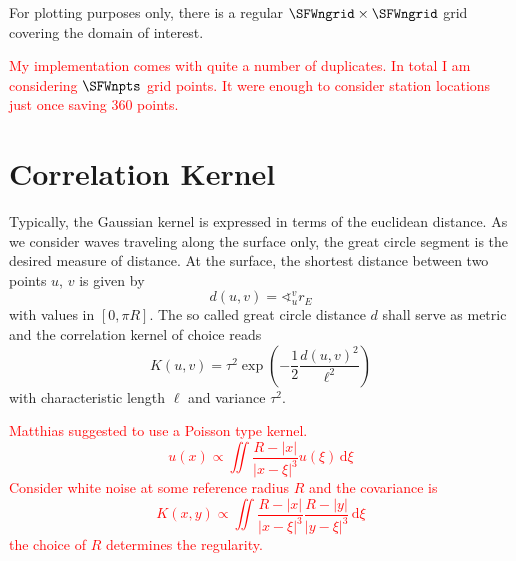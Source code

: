 \documentclass[11pt]{article}
\newcommand\worries[1]{\textcolor{red}{#1}}
\begin{document}
For plotting purposes only, there is a regular $\SFWngrid \times \SFWngrid$ grid covering the domain of interest.

\worries{My implementation comes with quite a number of duplicates.
In total I am considering $\SFWnpts$ grid points.
It were enough to consider station locations just once saving 360 points.}


\section{Correlation Kernel}

Typically, the Gaussian kernel is expressed in terms of the euclidean distance.
As we consider waves traveling along the surface only, the great circle segment is the desired measure of distance.
At the surface, the shortest distance between two points $u$, $v$ is given by
\begin{equation}
    d(u,v) = \sphericalangle_u^v r_E
\end{equation}
with values in $[0, \pi R]$.
The so called great circle distance $d$ shall serve as metric and the correlation kernel of choice reads
\begin{equation}
    K(u,v) = \tau^2 \exp\!\left(-\frac 12 \frac{d(u,v)^2}{\ell^2}\right)
\end{equation}
with characteristic length $\ell$ and variance $\tau^2$.

\worries{Matthias suggested to use a Poisson type kernel.
\begin{equation}
    u(x) \propto \iint \frac{R-|x|}{|x-\xi|^3} u(\xi) \, \mathrm d \xi
\end{equation}
Consider white noise at some reference radius $R$ and the covariance is
\begin{equation}
    K(x,y) \propto \iint \frac{R-|x|}{|x-\xi|^3} \frac{R-|y|}{|y-\xi|^3} \, \mathrm d \xi
\end{equation}
the choice of $R$ determines the regularity. }
\end{document}
